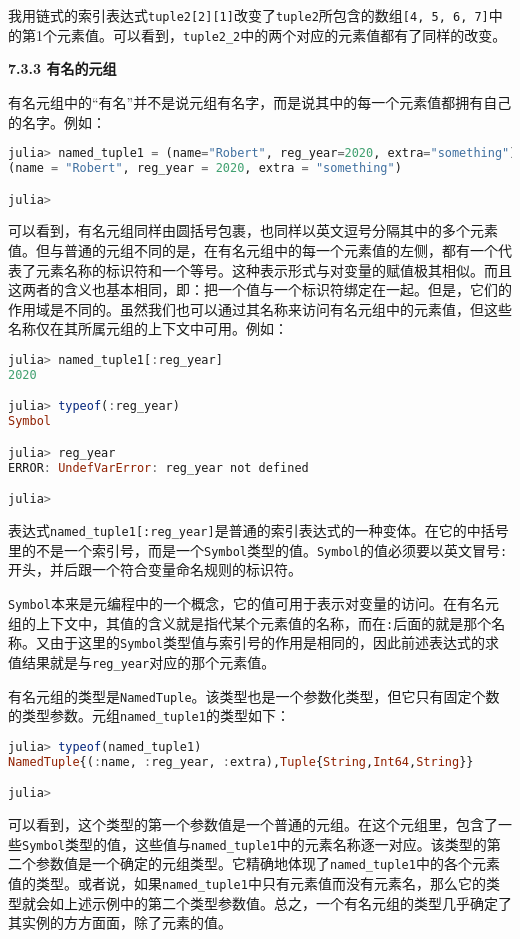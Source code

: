 我用链式的索引表达式\verb|tuple2[2][1]|改变了\verb|tuple2|所包含的数组\verb|[4, 5, 6, 7]|中的第1个元素值。可以看到，\verb|tuple2_2|中的两个对应的元素值都有了同样的改变。

\textbf{7.3.3 有名的元组}

有名元组中的“有名”并不是说元组有名字，而是说其中的每一个元素值都拥有自己的名字。例如：
\begin{lstlisting}[language=julia]
julia> named_tuple1 = (name="Robert", reg_year=2020, extra="something")
(name = "Robert", reg_year = 2020, extra = "something")

julia> 
\end{lstlisting}

可以看到，有名元组同样由圆括号包裹，也同样以英文逗号分隔其中的多个元素值。但与普通的元组不同的是，在有名元组中的每一个元素值的左侧，都有一个代表了元素名称的标识符和一个等号。这种表示形式与对变量的赋值极其相似。而且这两者的含义也基本相同，即：把一个值与一个标识符绑定在一起。但是，它们的作用域是不同的。虽然我们也可以通过其名称来访问有名元组中的元素值，但这些名称仅在其所属元组的上下文中可用。例如：
\begin{lstlisting}[language=julia]
julia> named_tuple1[:reg_year]
2020

julia> typeof(:reg_year)
Symbol

julia> reg_year
ERROR: UndefVarError: reg_year not defined

julia> 
\end{lstlisting}

表达式\verb|named_tuple1[:reg_year]|是普通的索引表达式的一种变体。在它的中括号里的不是一个索引号，而是一个\verb|Symbol|类型的值。\verb|Symbol|的值必须要以英文冒号\verb|:|开头，并后跟一个符合变量命名规则的标识符。

\verb|Symbol|本来是元编程中的一个概念，它的值可用于表示对变量的访问。在有名元组的上下文中，其值的含义就是指代某个元素值的名称，而在\verb|:|后面的就是那个名称。又由于这里的\verb|Symbol|类型值与索引号的作用是相同的，因此前述表达式的求值结果就是与\verb|reg_year|对应的那个元素值。

有名元组的类型是\verb|NamedTuple|。该类型也是一个参数化类型，但它只有固定个数的类型参数。元组\verb|named_tuple1|的类型如下：
\begin{lstlisting}[language=julia]
julia> typeof(named_tuple1)
NamedTuple{(:name, :reg_year, :extra),Tuple{String,Int64,String}}

julia> 
\end{lstlisting}

可以看到，这个类型的第一个参数值是一个普通的元组。在这个元组里，包含了一些\verb|Symbol|类型的值，这些值与\verb|named_tuple1|中的元素名称逐一对应。该类型的第二个参数值是一个确定的元组类型。它精确地体现了\verb|named_tuple1|中的各个元素值的类型。或者说，如果\verb|named_tuple1|中只有元素值而没有元素名，那么它的类型就会如上述示例中的第二个类型参数值。总之，一个有名元组的类型几乎确定了其实例的方方面面，除了元素的值。

